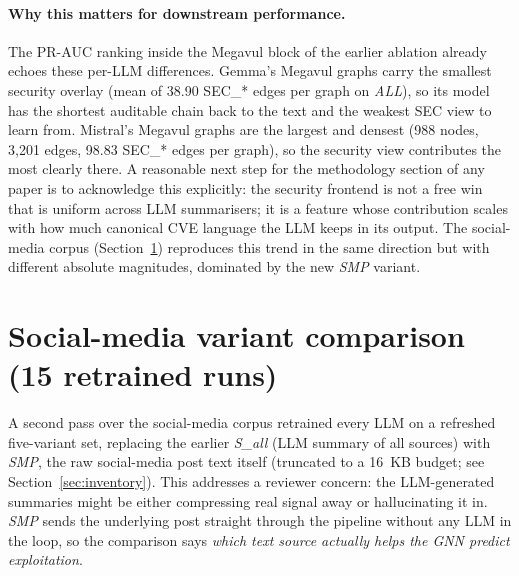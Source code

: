 \documentclass[11pt,a4paper]{article}
\begin{document}
\paragraph{Why this matters for downstream performance.}
The PR-AUC ranking inside the Megavul block of the
earlier ablation already echoes these per-LLM
differences. Gemma's Megavul graphs carry the smallest
security overlay (mean of 38.90 SEC\_* edges per graph on
\emph{ALL}), so its model has the shortest auditable
chain back to the text and the weakest SEC view to learn
from. Mistral's Megavul graphs are the largest and
densest (988 nodes, 3{,}201 edges, 98.83 SEC\_* edges per
graph), so the security view contributes the most
clearly there. A reasonable next step for the
methodology section of any paper is to acknowledge this
explicitly: the security frontend is not a free win that
is uniform across LLM summarisers; it is a feature whose
contribution scales with how much canonical CVE language
the LLM keeps in its output. The social-media corpus
(Section~\ref{sec:smp-variant-comparison}) reproduces
this trend in the same direction but with different
absolute magnitudes, dominated by the new \emph{SMP}
variant.

\section{Social-media variant comparison (15 retrained runs)}
\label{sec:smp-variant-comparison}

A second pass over the social-media corpus retrained every
LLM on a refreshed five-variant set, replacing the earlier
\emph{S\_all} (LLM summary of all sources) with \emph{SMP},
the raw social-media post text itself (truncated to a
16~KB budget; see Section~\ref{sec:inventory}). This
addresses a reviewer concern: the LLM-generated summaries
might be either compressing real signal away or
hallucinating it in. \emph{SMP} sends the underlying post
straight through the pipeline without any LLM in the loop,
so the comparison says \emph{which text source actually
helps the GNN predict exploitation}.
\end{document}
